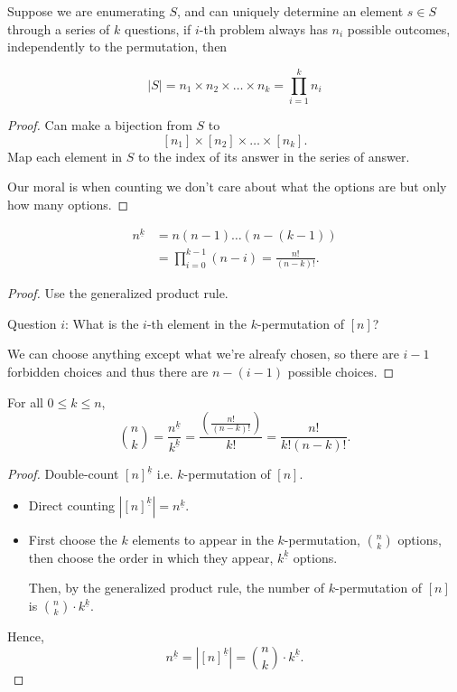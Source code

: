 \begin{theorem} \label{thm: GeneralizedProductRule}
Suppose we are enumerating \(S\), and can uniquely determine an element \(s \in S\) through a series of \(k\) questions, if \(i\)-th problem always has \(n_i\) possible outcomes, independently to the permutation, then     

\[
    \vert S \vert = n_1 \times n_2 \times \dots \times n_k = \prod_{i=1}^{k} n_i
\]
\end{theorem}
\begin{proof}
    Can make a bijection from \(S\) to 
    \[
        [n_1] \times [n_2] \times \dots \times [n_k].
    \] 
    Map each element in \(S\) to the index of its answer in the series of answer. 
    
    Our moral is when counting we don't care about what the options are but only how many options. 
\end{proof}

\begin{proposition}
\begin{align*}
    n^{\underline{k}} &= n(n-1)\dots (n - (k-1)) \\
    &= \prod_{i=0}^{k-1}(n-i) = \frac{n!}{(n-k)!}.
\end{align*}
\end{proposition}
\begin{proof}
    Use the generalized product rule. 

    Question \(i\): What is the \(i\)-th element in the \(k\)-permutation of \([n]\)? 
    
    We can choose anything except what we're alreafy chosen, so there are \(i-1\) forbidden choices and thus there are \(n-(i-1)\) possible choices.  
\end{proof}

\begin{proposition}
    For all \(0 \le k \le n\), 
    \[
        \binom{n}{k} = \frac{n^{\underline{k}}}{k^{\underline{k}}} = \frac{\left( \frac{n!}{(n-k)!} \right) }{k!} = \frac{n!}{k!(n-k)!}.
    \] 
\end{proposition}
\begin{proof}
    Double-count \([n]^{\underline{k}}\) i.e. \(k\)-permutation of \([n]\). 
    \begin{itemize}
        \item Direct counting \(\left\vert [n]^{\underline{k}} \right\vert = n^{\underline{k}} \). 
        \item First choose the \(k\) elements to appear in the \(k\)-permutation, \(\binom{n}{k}\) options, then choose the order in which they appear, \(k^{\underline{k}}\) options. 
        
        Then, by the generalized product rule, the number of \(k\)-permutation of \([n]\) is \(\binom{n}{k} \cdot k^{\underline{k}}\).   
    \end{itemize}   
    Hence,
    \[
        n^{\underline{k}} = \left\vert [n]^{\underline{k}} \right\vert = \binom{n}{k} \cdot k^{\underline{k}}.
    \] 
\end{proof}

